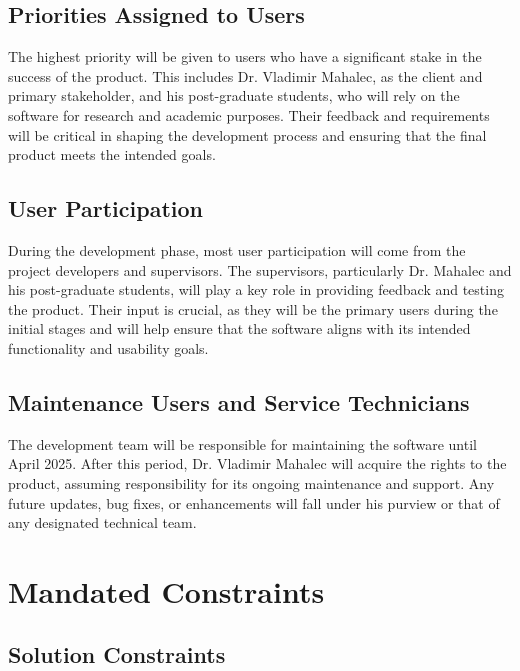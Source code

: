 \documentclass[12pt]{article}
\begin{document}
\subsection{Priorities Assigned to Users}
The highest priority will be given to users who have a significant stake in the success of the product. This includes Dr. Vladimir Mahalec, as the client and primary stakeholder, and his post-graduate students, who will rely on the software for research and academic purposes. Their feedback and requirements will be critical in shaping the development process and ensuring that the final product meets the intended goals.

\subsection{User Participation}
During the development phase, most user participation will come from the project developers and supervisors. The supervisors, particularly Dr. Mahalec and his post-graduate students, will play a key role in providing feedback and testing the product. Their input is crucial, as they will be the primary users during the initial stages and will help ensure that the software aligns with its intended functionality and usability goals.

\subsection{Maintenance Users and Service Technicians}
The development team will be responsible for maintaining the software until April 2025. After this period, Dr. Vladimir Mahalec will acquire the rights to the product, assuming responsibility for its ongoing maintenance and support. Any future updates, bug fixes, or enhancements will fall under his purview or that of any designated technical team.

\section{Mandated Constraints}
\subsection{Solution Constraints}
\end{document}
